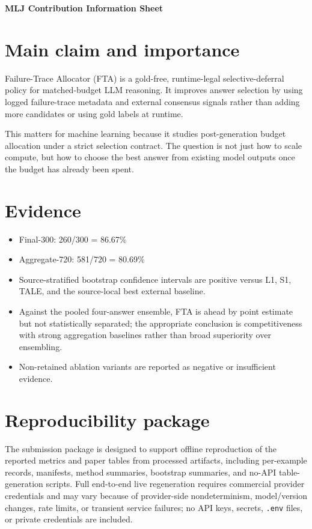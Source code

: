 \documentclass[11pt]{article}
\begin{document}
\begin{center}
{\Large \textbf{MLJ Contribution Information Sheet}}\\[4pt]
\end{center}

\section*{Main claim and importance}
Failure-Trace Allocator (FTA) is a gold-free, runtime-legal selective-deferral policy for matched-budget LLM reasoning. It improves answer selection by using logged failure-trace metadata and external consensus signals rather than adding more candidates or using gold labels at runtime.

This matters for machine learning because it studies post-generation budget allocation under a strict selection contract. The question is not just how to scale compute, but how to choose the best answer from existing model outputs once the budget has already been spent.

\section*{Evidence}
\begin{itemize}[leftmargin=*]
  \item Final-300: 260/300 = 86.67\%
  \item Aggregate-720: 581/720 = 80.69\%
  \item Source-stratified bootstrap confidence intervals are positive versus L1, S1, TALE, and the source-local best external baseline.
  \item Against the pooled four-answer ensemble, FTA is ahead by point estimate but not statistically separated; the appropriate conclusion is competitiveness with strong aggregation baselines rather than broad superiority over ensembling.
  \item Non-retained ablation variants are reported as negative or insufficient evidence.
\end{itemize}

\section*{Reproducibility package}
The submission package is designed to support offline reproduction of the reported
metrics and paper tables from processed artifacts, including per-example records,
manifests, method summaries, bootstrap summaries, and no-API table-generation scripts.
Full end-to-end live regeneration requires commercial provider credentials and may vary
because of provider-side nondeterminism, model/version changes, rate limits, or transient
service failures; no API keys, secrets, \texttt{.env} files, or private credentials are included.
\end{document}

